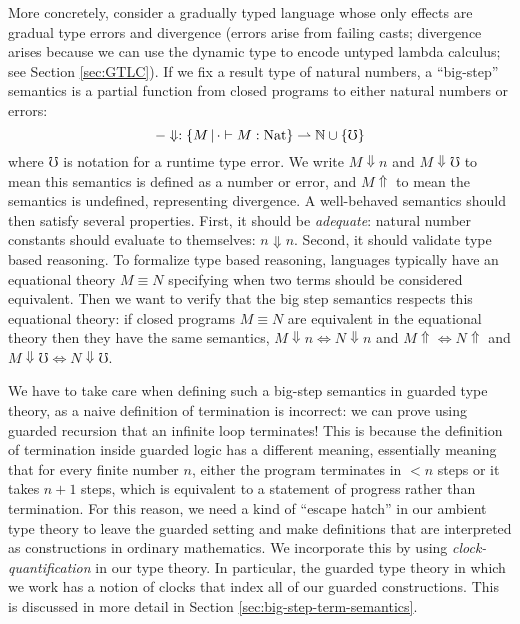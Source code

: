 More concretely, consider a gradually typed language whose only effects are
gradual type errors and divergence (errors arise from failing casts; divergence
arises because we can use the dynamic type to encode untyped lambda calculus;
see Section \ref{sec:GTLC}). If we fix a result type of natural numbers, a
``big-step'' semantics is a partial function from closed programs to either natural
numbers or errors:
%
\[ -\Downarrow : \{M \,|\, \cdot \vdash M : \text{Nat} \} \rightharpoonup \mathbb{N}
\cup \{\mho\} \] 
%
where $\mho$ is notation for a runtime type error. We write $M \Downarrow n$ and
$M\Downarrow \mho$ to mean this semantics is defined as a number or error, and
$M\Uparrow$ to mean the semantics is undefined, representing divergence.
%
A well-behaved semantics should then satisfy several properties. First, it
should be \emph{adequate}: natural number constants should evaluate to
themselves: $n \Downarrow n$. Second, it should validate type based reasoning.
To formalize type based reasoning, languages typically have an equational theory
$M \equiv N$ specifying when two terms should be considered equivalent.
Then we want to verify that the big step semantics respects this equational
theory: if closed programs $M \equiv N$ are equivalent in the equational theory
then they have the same semantics, $M \Downarrow n \iff N \Downarrow n$ and
$M\Uparrow \iff N \Uparrow$ and $M \Downarrow \mho \iff N \Downarrow \mho$.


We have to take care when defining such a big-step semantics in
guarded type theory, as a naive definition of termination is
incorrect: we can prove using guarded recursion that an infinite loop
terminates! This is because the definition of termination inside
guarded logic has a different meaning, essentially meaning that for
every finite number $n$, either the program terminates in $< n$ steps
or it takes $n+1$ steps, which is equivalent to a statement of
progress rather than termination. For this reason, we need a kind of
``escape hatch'' in our ambient type theory to leave the guarded
setting and make definitions that are interpreted as constructions in
ordinary mathematics. We incorporate this by using
\emph{clock-quantification} \cite{atkey-mcbride2013, kristensen-mogelberg-vezzosi2022}
in our type theory. In particular, the guarded type theory in which we work has
a notion of clocks that index all of our guarded constructions. This is
discussed in more detail in Section \ref{sec:big-step-term-semantics}.

